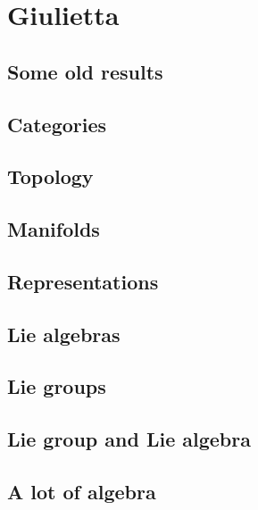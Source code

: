 \documentclass[a4paper,twoside,11pt]{book}
\begin{document}
\part{Giulietta}

\chapter{Some old results}


\chapter{Categories}        \label{chap_category}


\chapter{Topology}              \label{chap_topology}



\chapter{Manifolds} \label{Chapitre_FB}




\chapter{Representations}


\chapter{Lie algebras}







\chapter{Lie groups}


\chapter{Lie group and Lie algebra}




\chapter{A lot of algebra}



\end{document}
